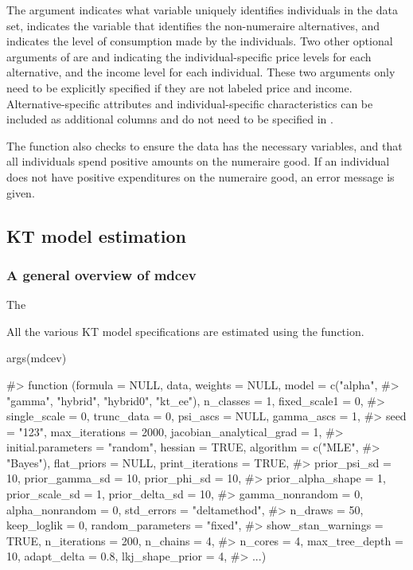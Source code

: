 The  argument indicates what variable uniquely identifies
individuals in the data set,  indicates the variable that
identifies the non-numeraire alternatives, and  indicates
the level of consumption made by the individuals. Two other optional
arguments of  are  and 
indicating the individual-specific price levels for each alternative,
and the income level for each individual. These two arguments only need
to be explicitly specified if they are not labeled price and income.
Alternative-specific attributes and individual-specific characteristics
can be included as additional columns and do not need to be specified in
.

The  function also checks to ensure the data has the
necessary variables, and that all individuals spend positive amounts on
the numeraire good. If an individual does not have positive expenditures
on the numeraire good, an error message is given.

\hypertarget{kt-model-estimation}{%
\subsection{KT model estimation}\label{kt-model-estimation}}

\hypertarget{a-general-overview-of-mdcev}{%
\subsubsection{A general overview of
mdcev}\label{a-general-overview-of-mdcev}}

The 

All the various KT model specifications are estimated using the
 function.

\begin{example}
args(mdcev)

#> function (formula = NULL, data, weights = NULL, model = c("alpha", 
#>     "gamma", "hybrid", "hybrid0", "kt_ee"), n_classes = 1, fixed_scale1 = 0, 
#>     single_scale = 0, trunc_data = 0, psi_ascs = NULL, gamma_ascs = 1, 
#>     seed = "123", max_iterations = 2000, jacobian_analytical_grad = 1, 
#>     initial.parameters = "random", hessian = TRUE, algorithm = c("MLE", 
#>         "Bayes"), flat_priors = NULL, print_iterations = TRUE, 
#>     prior_psi_sd = 10, prior_gamma_sd = 10, prior_phi_sd = 10, 
#>     prior_alpha_shape = 1, prior_scale_sd = 1, prior_delta_sd = 10, 
#>     gamma_nonrandom = 0, alpha_nonrandom = 0, std_errors = "deltamethod", 
#>     n_draws = 50, keep_loglik = 0, random_parameters = "fixed", 
#>     show_stan_warnings = TRUE, n_iterations = 200, n_chains = 4, 
#>     n_cores = 4, max_tree_depth = 10, adapt_delta = 0.8, lkj_shape_prior = 4, 
#>     ...) 
\end{example}

